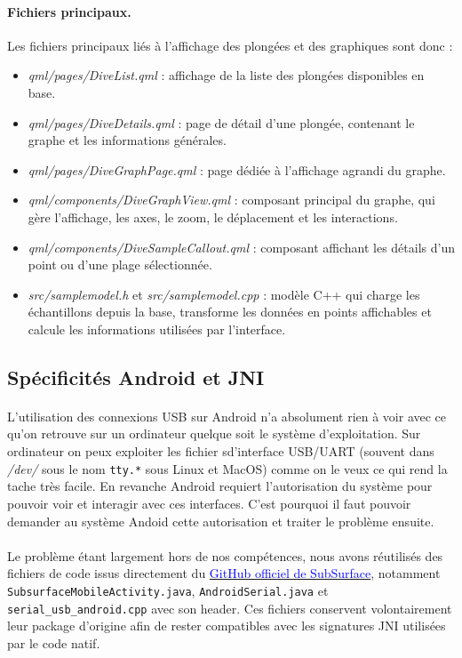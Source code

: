\documentclass{article}
\begin{document}
\paragraph{Fichiers principaux.}
Les fichiers principaux liés à l'affichage des plongées et des graphiques sont
donc :
\begin{itemize}
    \item \textit{qml/pages/DiveList.qml} : affichage de la liste des plongées
    disponibles en base.
    \item \textit{qml/pages/DiveDetails.qml} : page de détail d'une plongée,
    contenant le graphe et les informations générales.
    \item \textit{qml/pages/DiveGraphPage.qml} : page dédiée à l'affichage
    agrandi du graphe.
    \item \textit{qml/components/DiveGraphView.qml} : composant principal du
    graphe, qui gère l'affichage, les axes, le zoom, le déplacement et les
    interactions.
    \item \textit{qml/components/DiveSampleCallout.qml} : composant affichant
    les détails d'un point ou d'une plage sélectionnée.
    \item \textit{src/samplemodel.h} et \textit{src/samplemodel.cpp} : modèle
    C++ qui charge les échantillons depuis la base, transforme les données en
    points affichables et calcule les informations utilisées par l'interface.
\end{itemize}

\subsection{Spécificités Android et JNI}
\paragraph{}
L'utilisation des connexions USB sur Android n'a absolument rien à voir avec ce qu'on retrouve sur un ordinateur quelque soit le système d'exploitation. Sur ordinateur on peux exploiter les fichier sd'interface USB/UART (souvent dans \textit{/dev/} sous le nom \texttt{tty.*} sous Linux et MacOS) comme on le veux ce qui rend la tache très facile. En revanche Android requiert l'autorisation du système pour pouvoir voir et interagir avec ces interfaces. C'est pourquoi il faut pouvoir demander au système Andoid cette autorisation et traiter le problème ensuite.
\paragraph{}
Le problème étant largement hors de nos compétences, nous avons réutilisés des fichiers de code issus directement du \href{https://github.com/subsurface/subsurface}{\textcolor{blue}{GitHub officiel de SubSurface}}, notamment
\texttt{SubsurfaceMobileActivity.java}, \texttt{AndroidSerial.java} et
\texttt{serial\_usb\_android.cpp} avec son header. Ces fichiers conservent volontairement leur
package d'origine afin de rester compatibles avec les signatures JNI utilisées
par le code natif.
\end{document}
